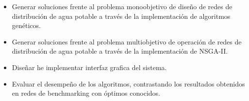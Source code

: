 \documentclass[11pt,letterpaper]{article}
\begin{document}
\begin{itemize}
\item Generar soluciones frente al problema monoobjetivo de diseño de redes de distribución de agua potable a través de la implementación de algoritmos genéticos.
\item Generar soluciones frente al problema multiobjetivo de operación de redes de distribución de agua potable a través de la implementación de NSGA-II.
\item Diseñar he implementar interfaz grafica del sistema. 
\item Evaluar el desempeño de los algoritmos, contrastando los resultados obtenidos en redes de benchmarking con óptimos conocidos.

\end{itemize}
\end{document}
